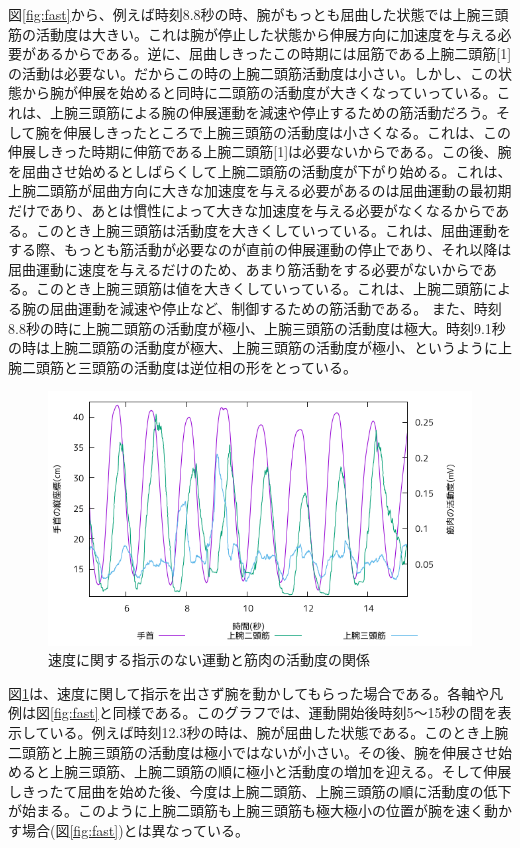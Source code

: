 \documentclass{jsarticle}
\begin{document}
図\ref{fig:fast}から、例えば時刻8.8秒の時、腕がもっとも屈曲した状態では上腕三頭筋の活動度は大きい。これは腕が停止した状態から伸展方向に加速度を与える必要があるからである。逆に、屈曲しきったこの時期には屈筋である上腕二頭筋[1]の活動は必要ない。だからこの時の上腕二頭筋活動度は小さい。しかし、この状態から腕が伸展を始めると同時に二頭筋の活動度が大きくなっていっている。これは、上腕三頭筋による腕の伸展運動を減速や停止するための筋活動だろう。そして腕を伸展しきったところで上腕三頭筋の活動度は小さくなる。これは、この伸展しきった時期に伸筋である上腕二頭筋[1]は必要ないからである。この後、腕を屈曲させ始めるとしばらくして上腕二頭筋の活動度が下がり始める。これは、上腕二頭筋が屈曲方向に大きな加速度を与える必要があるのは屈曲運動の最初期だけであり、あとは慣性によって大きな加速度を与える必要がなくなるからである。このとき上腕三頭筋は活動度を大きくしていっている。これは、屈曲運動をする際、もっとも筋活動が必要なのが直前の伸展運動の停止であり、それ以降は屈曲運動に速度を与えるだけのため、あまり筋活動をする必要がないからである。このとき上腕三頭筋は値を大きくしていっている。これは、上腕二頭筋による腕の屈曲運動を減速や停止など、制御するための筋活動である。
また、時刻8.8秒の時に上腕二頭筋の活動度が極小、上腕三頭筋の活動度は極大。時刻9.1秒の時は上腕二頭筋の活動度が極大、上腕三頭筋の活動度が極小、というように上腕二頭筋と三頭筋の活動度は逆位相の形をとっている。

\begin{figure}[b]
  \begin{center}
    \includegraphics[width=15cm]{images/s1proto.png}
  \end{center}
  \caption{速度に関する指示のない運動と筋肉の活動度の関係}
  \label{fig:slow}
\end{figure}
図\ref{fig:slow}は、速度に関して指示を出さず腕を動かしてもらった場合である。各軸や凡例は図\ref{fig:fast}と同様である。このグラフでは、運動開始後時刻5〜15秒の間を表示している。例えば時刻12.3秒の時は、腕が屈曲した状態である。このとき上腕二頭筋と上腕三頭筋の活動度は極小ではないが小さい。その後、腕を伸展させ始めると上腕三頭筋、上腕二頭筋の順に極小と活動度の増加を迎える。そして伸展しきったて屈曲を始めた後、今度は上腕二頭筋、上腕三頭筋の順に活動度の低下が始まる。このように上腕二頭筋も上腕三頭筋も極大極小の位置が腕を速く動かす場合(図\ref{fig:fast})とは異なっている。
\end{document}

